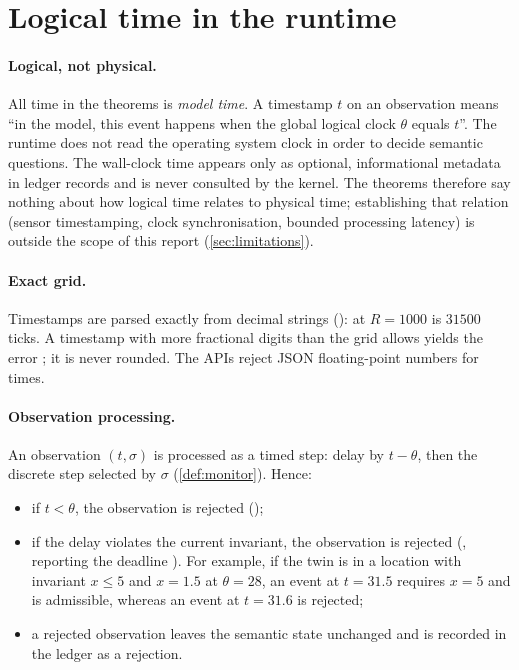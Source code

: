 \section{Logical time in the runtime}\label{sec:time}

\paragraph{Logical, not physical.}
All time in the theorems is \emph{model time}. A timestamp $t$ on an observation
means ``in the model, this event happens when the global logical clock $\theta$
equals $t$''. The runtime does not read the operating system clock in order to
decide semantic questions. The wall-clock time appears only as optional,
informational metadata in ledger records and is never consulted by the kernel.
The theorems therefore say nothing about how logical time relates to physical
time; establishing that relation (sensor timestamping, clock synchronisation,
bounded processing latency) is outside the scope of this report
(\cref{sec:limitations}).

\paragraph{Exact grid.}
Timestamps are parsed exactly from decimal strings ():
 at $R=1000$ is $31500$ ticks. A timestamp with more fractional
digits than the grid allows yields the error ; it is
never rounded. The APIs reject JSON floating-point numbers for times.

\paragraph{Observation processing.}
An observation $(t,\sigma)$ is processed as a timed step: delay by $t-\theta$, then
the discrete step selected by $\sigma$ (\cref{def:monitor}). Hence:
\begin{itemize}
\item if $t<\theta$, the observation is rejected ();
\item if the delay violates the current invariant, the observation is rejected
  (, reporting the deadline ). For
  example, if the twin is in a location with invariant $x\le 5$ and $x=1.5$ at
  $\theta=28$, an event at $t=31.5$ requires $x=5$ and is admissible, whereas an
  event at $t=31.6$ is rejected;
\item a rejected observation leaves the semantic state unchanged and is recorded
  in the ledger as a rejection.
\end{itemize}

